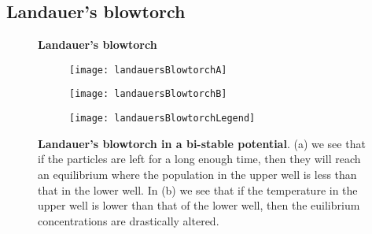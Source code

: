 \subsection{Landauer's blowtorch} \label{landauersBlowtorch}
\begin{figure}[tb]
	\center
	\textbf{Landauer's blowtorch}
	\vspace{0.5cm}

	\begin{subfigure}{0.42\textwidth}
		\texttt{[image: landauersBlowtorchA]}
		\caption{\label{fig:landauerA}}
	\end{subfigure}
	\begin{subfigure}{0.42\textwidth}
		\texttt{[image: landauersBlowtorchB]}
		\caption{\label{fig:landauerB}}
	\end{subfigure}
	\begin{subfigure}{0.12\textwidth}
		\texttt{[image: landauersBlowtorchLegend]}
	\end{subfigure}

\caption{\textbf{Landauer's blowtorch in a bi-stable potential}. (a) we see that if the particles are left for a long enough time, then they will reach an equilibrium where the population in the upper well is less than that in the lower well. In (b) we see that if the temperature in the upper well is lower than that of the lower well, then the euilibrium concentrations are drastically altered.}
\label{fig:landauersBlowtorch}
\end{figure}
